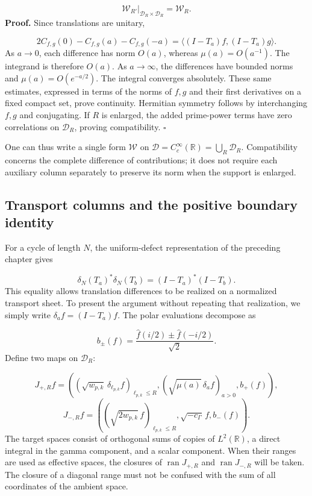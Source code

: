 \[
\mathscr W_{R'}|_{\mathcal D_R\times\mathcal D_R}=\mathscr W_R.
\]
\textbf{Proof.} Since translations are unitary,

\[
2C_{f,g}(0)-C_{f,g}(a)-C_{f,g}(-a)
=\langle(I-T_a)f,(I-T_a)g\rangle.
\]
As \(a\to0\), each difference has norm \(O(a)\), whereas \(\mu(a)=O(a^{-1})\). The integrand is therefore \(O(a)\). As \(a\to\infty\), the differences have bounded norms and \(\mu(a)=O(e^{-a/2})\). The integral converges absolutely. These same estimates, expressed in terms of the norms of \(f,g\) and their first derivatives on a fixed compact set, prove continuity. Hermitian symmetry follows by interchanging \(f,g\) and conjugating. If \(R\) is enlarged, the added prime-power terms have zero correlations on \(\mathcal D_R\), proving compatibility. \hfill\(\square\)

One can thus write a single form \(\mathscr W\) on \(\mathcal D=C_c^\infty(\mathbb R)=\bigcup_R\mathcal D_R\). Compatibility concerns the complete difference of contributions; it does not require each auxiliary column separately to preserve its norm when the support is enlarged.

\subsection{Transport columns and the positive boundary identity}
\label{rz:columnas}
For a cycle of length \(N\), the uniform-defect representation of the preceding chapter gives

\[
\delta_N(T_a)^*\delta_N(T_b)=(I-T_a)^*(I-T_b).
\]
This equality allows translation differences to be realized on a normalized transport sheet. To present the argument without repeating that realization, we simply write \(\delta_af=(I-T_a)f\). The polar evaluations decompose as

\[
b_\pm(f)=\frac{\widehat f(i/2)\pm\widehat f(-i/2)}{\sqrt2}.
\]
Define two maps on \(\mathcal D_R\):

\[
J_{+,R}f=
\left(
(\sqrt{w_{p,k}}\,\delta_{\ell_{p,k}}f)_{\ell_{p,k}\leq R},
(\sqrt{\mu(a)}\,\delta_af)_{a>0},
b_+(f)
\right),
\]
\[
J_{-,R}f=
\left(
(\sqrt{2w_{p,k}}\,f)_{\ell_{p,k}\leq R},
\sqrt{-c_\Gamma}\,f,
b_-(f)
\right).
\]
The target spaces consist of orthogonal sums of copies of \(L^2(\mathbb R)\), a direct integral in the gamma component, and a scalar component. When their ranges are used as effective spaces, the closures of \(\operatorname{ran}J_{+,R}\) and \(\operatorname{ran}J_{-,R}\) will be taken. The closure of a diagonal range must not be confused with the sum of all coordinates of the ambient space.

